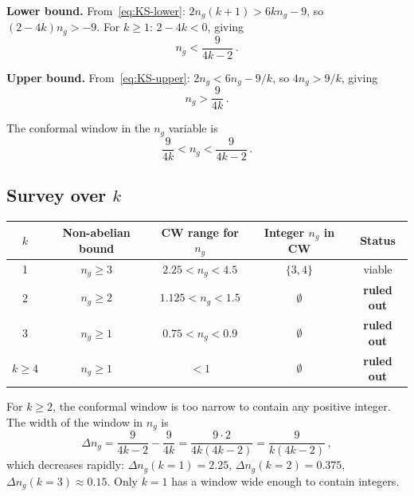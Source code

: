 \documentclass[11pt,a4paper]{article}
\theoremstyle{plain}
\theoremstyle{definition}
\theoremstyle{remark}
\newcommand{\ngen}{n_g}
\begin{document}
\textbf{Lower bound.}  From~\eqref{eq:KS-lower}:
$2\ngen(k+1) > 6k\ngen - 9$, so $(2 - 4k)\ngen > -9$.  For $k \geq 1$:
$2 - 4k < 0$, giving
\begin{equation}\label{eq:KS-lower-ng}
  \ngen < \frac{9}{4k - 2}\,.
\end{equation}

\textbf{Upper bound.}  From~\eqref{eq:KS-upper}:
$2\ngen < 6\ngen - 9/k$, so $4\ngen > 9/k$, giving
\begin{equation}\label{eq:KS-upper-ng}
  \ngen > \frac{9}{4k}\,.
\end{equation}

The conformal window in the $\ngen$ variable is
\begin{equation}\label{eq:KS-CW-ng}
  \frac{9}{4k} < \ngen < \frac{9}{4k - 2}\,.
\end{equation}

\subsection{Survey over $k$}

\begin{center}
\renewcommand{\arraystretch}{1.5}
\begin{tabular}{c c c c c}
\toprule
$k$ & Non-abelian bound & CW range for $\ngen$ &
  Integer $\ngen$ in CW & Status \\
\midrule
1 & $\ngen \geq 3$ & $2.25 < \ngen < 4.5$ & $\{3, 4\}$ & viable \\
2 & $\ngen \geq 2$ & $1.125 < \ngen < 1.5$ & $\emptyset$ &
  \textbf{ruled out} \\
3 & $\ngen \geq 1$ & $0.75 < \ngen < 0.9$ & $\emptyset$ &
  \textbf{ruled out} \\
$k \geq 4$ & $\ngen \geq 1$ & $< 1$ & $\emptyset$ &
  \textbf{ruled out} \\
\bottomrule
\end{tabular}
\end{center}

For $k \geq 2$, the conformal window is too narrow to contain any
positive integer.  The width of the window in $\ngen$ is
\begin{equation}
  \Delta\ngen = \frac{9}{4k-2} - \frac{9}{4k}
  = \frac{9 \cdot 2}{4k(4k-2)} = \frac{9}{k(4k-2)}\,,
\end{equation}
which decreases rapidly: $\Delta\ngen(k{=}1) = 2.25$,
$\Delta\ngen(k{=}2) = 0.375$, $\Delta\ngen(k{=}3) \approx 0.15$.
Only $k = 1$ has a window wide enough to contain integers.
\end{document}

